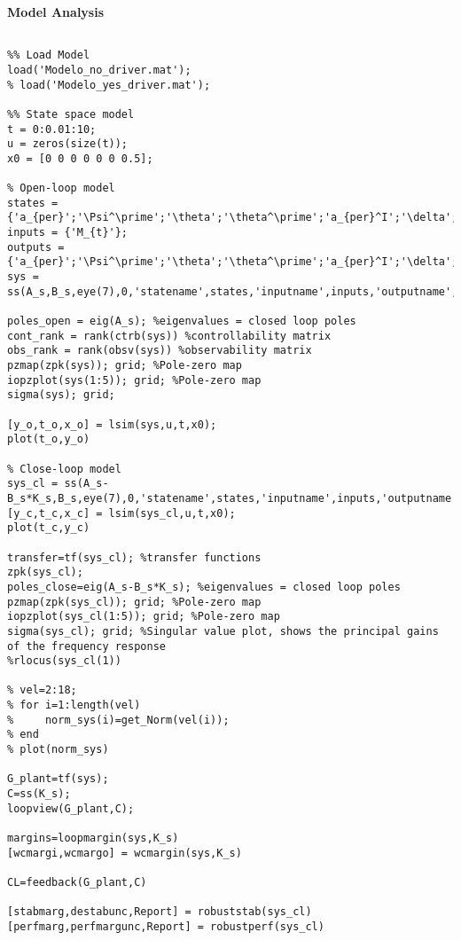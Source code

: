 \newpage
\textbf{Model Analysis}
\begin{lstlisting}[style=codematlab]

%% Load Model
load('Modelo_no_driver.mat');
% load('Modelo_yes_driver.mat');

%% State space model
t = 0:0.01:10;
u = zeros(size(t));
x0 = [0 0 0 0 0 0 0.5];

% Open-loop model
states = {'a_{per}';'\Psi^\prime';'\theta';'\theta^\prime';'a_{per}^I';'\delta';'\delta^\prime'};
inputs = {'M_{t}'};
outputs = {'a_{per}';'\Psi^\prime';'\theta';'\theta^\prime';'a_{per}^I';'\delta';'\delta^\prime'};
sys = ss(A_s,B_s,eye(7),0,'statename',states,'inputname',inputs,'outputname',outputs);

poles_open = eig(A_s); %eigenvalues = closed loop poles
cont_rank = rank(ctrb(sys)) %controllability matrix
obs_rank = rank(obsv(sys)) %observability matrix
pzmap(zpk(sys)); grid; %Pole-zero map
iopzplot(sys(1:5)); grid; %Pole-zero map
sigma(sys); grid;

[y_o,t_o,x_o] = lsim(sys,u,t,x0); 
plot(t_o,y_o)

% Close-loop model
sys_cl = ss(A_s-B_s*K_s,B_s,eye(7),0,'statename',states,'inputname',inputs,'outputname',outputs); 
[y_c,t_c,x_c] = lsim(sys_cl,u,t,x0);
plot(t_c,y_c)

transfer=tf(sys_cl); %transfer functions
zpk(sys_cl);
poles_close=eig(A_s-B_s*K_s); %eigenvalues = closed loop poles
pzmap(zpk(sys_cl)); grid; %Pole-zero map
iopzplot(sys_cl(1:5)); grid; %Pole-zero map
sigma(sys_cl); grid; %Singular value plot, shows the principal gains of the frequency response
%rlocus(sys_cl(1))

% vel=2:18;
% for i=1:length(vel)
%     norm_sys(i)=get_Norm(vel(i));
% end
% plot(norm_sys)

G_plant=tf(sys);
C=ss(K_s);
loopview(G_plant,C);

margins=loopmargin(sys,K_s)
[wcmargi,wcmargo] = wcmargin(sys,K_s) 

CL=feedback(G_plant,C)

[stabmarg,destabunc,Report] = robuststab(sys_cl) 
[perfmarg,perfmargunc,Report] = robustperf(sys_cl) 

\end{lstlisting}

